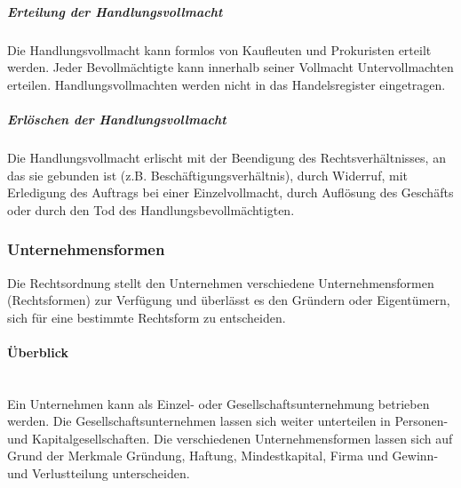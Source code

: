 \subparagraph{Erteilung der Handlungsvollmacht} Die Handlungsvollmacht kann formlos von Kaufleuten und Prokuristen erteilt werden. Jeder Bevollmächtigte kann innerhalb seiner Vollmacht Untervollmachten erteilen. Handlungsvollmachten werden nicht in das Handelsregister eingetragen.
	
\subparagraph{Erlöschen der Handlungsvollmacht} Die Handlungsvollmacht erlischt mit der Beendigung des Rechtsverhältnisses, an das sie gebunden ist (z.B. Beschäftigungsverhältnis), durch Widerruf, mit Erledigung des Auftrags bei einer Einzelvollmacht, durch Auflösung des Geschäfts oder durch den Tod des Handlungsbevollmächtigten.
	
\subsubsection{Unternehmensformen}

Die Rechtsordnung stellt den Unternehmen verschiedene Unternehmensformen (Rechtsformen) zur Verfügung und überlässt es den Gründern oder Eigentümern, sich für eine bestimmte Rechtsform zu entscheiden.
	
\paragraph{Überblick}~\\
Ein Unternehmen kann als Einzel- oder Gesellschaftsunternehmung betrieben werden. Die Gesellschaftsunternehmen lassen sich weiter unterteilen in Personen- und Kapitalgesellschaften. Die verschiedenen Unternehmensformen lassen sich auf Grund der Merkmale Gründung, Haftung, Mindestkapital, Firma und Gewinn- und Verlustteilung unterscheiden.\\
	
